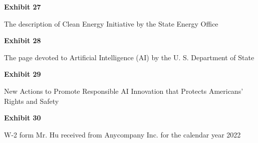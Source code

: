 \documentclass{article}
\begin{document}





\vspace*{\fill}
\begin{center}
{\LARGE \bf
Exhibit 27
}

\vspace{10\baselineskip}

{\large The description of Clean Energy Initiative by the State Energy Office }

\end{center}
\vspace*{\fill}

% 




\vspace*{\fill}
\begin{center}

{\LARGE \bf
Exhibit 28
}

\vspace{10\baselineskip}

{\large The page devoted to Artificial Intelligence (AI) by the U. S. Department of State}

\end{center}
\vspace*{\fill}






\vspace*{\fill}
\begin{center}

{\LARGE \bf
Exhibit 29
}

\vspace{10\baselineskip}

{\large New Actions to Promote Responsible AI Innovation that Protects Americans’ Rights and Safety}

\end{center}
\vspace*{\fill}






\vspace*{\fill}
\begin{center}

{\LARGE \bf
Exhibit 30
}

\vspace{10\baselineskip}

{\large W-2 form Mr. Hu received from Anycompany Inc. for the calendar year 2022}

\end{center}
\vspace*{\fill}

% 
\end{document}
